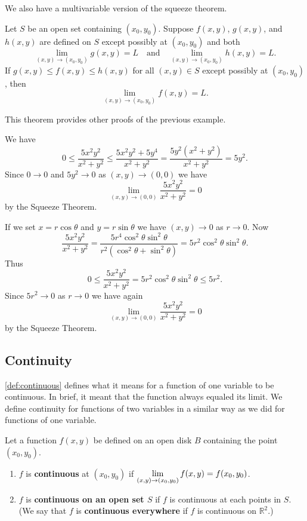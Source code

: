 We also have a multivariable version of the squeeze theorem.

\begin{theorem}\label{thm:multi_squeeze}%
Let $S$ be an open set containing $(x_0, y_0)$.  Suppose $f(x, y)$, $g(x, y)$, and $h(x, y)$ are defined on $S$ except possibly at $(x_0, y_0)$ and both
\[
\lim_{(x,y)\to(x_0, y_0)}g(x, y)=L
\quad\text{and}\quad
\lim_{(x,y)\to(x_0, y_0)} h(x, y) = L.
\]
If $g(x,y)\leq f(x, y)\leq h(x,y)$ for all $(x,y)\in S$ except possibly at $(x_0, y_0)$, then
\[\lim_{(x,y)\to(x_0, y_0)}f(x, y)=L.\]
\end{theorem}

This theorem provides other proofs of the previous example.

\begin{example}\label{ex_multlimit5b}%
We have 
\[
0\leq\frac{5x^2y^2}{x^2+y^2}\leq\frac{5x^2y^2+5y^4}{x^2+y^2}
=\frac{5y^2(x^2+y^2)}{x^2+y^2}=5y^2.
\]
Since $0\to0$ and $5y^2\to0$ as $(x,y)\to(0,0)$ we have 
\[\lim_{(x,y)\to(0,0)}\frac{5x^2y^2}{x^2+y^2}=0\]
by the Squeeze Theorem.

If we set $x = r \cos \theta$ and $y = r \sin \theta$ we have $(x, y) \rightarrow 0$ as $r \rightarrow 0$.  Now
\[
\frac{5x^2y^2}{x^2+y^2}
=\frac{5r^4\cos^2\theta\sin^2\theta}{r^2(\cos^2\theta +\sin^2\theta)}
=5r^2\cos^2\theta\sin^2\theta.
\]
Thus 
\[0\leq\frac{5x^2y^2}{x^2+y^2}=5r^2\cos^2\theta\sin^2\theta\leq5r^2.\]
Since $5r^2\to0$ as $r\to0$ we have again
\[\lim_{(x,y)\to(0,0)}\frac{5x^2y^2}{x^2+y^2}=0\]
by the Squeeze Theorem.
\end{example}

\subsection{Continuity}

\autoref{def:continuous} defines what it means for a function of one variable to be continuous. In brief, it meant that the function always equaled its limit. We define continuity for functions of two variables in a similar way as we did for functions of one variable.

\begin{definition}[Continuous]\label{def:multi_continuous}%
Let a function $f(x,y)$ be defined on an open disk $B$ containing the point $(x_0,y_0)$.
\begin{enumerate}
	\item $f$ is \textbf{continuous} at $(x_0,y_0)$ if $\displaystyle\lim_{(x,y)\to(x_0,y_0)} f(x,y) = f(x_0,y_0)$.
	\item	$f$ is \textbf{continuous on an open set $S$} if $f$ is continuous at each points in $S$. (We say that $f$ is \textbf{continuous everywhere} if $f$ is continuous on $\mathbb{R}^2$.)
\end{enumerate}
\end{definition}


